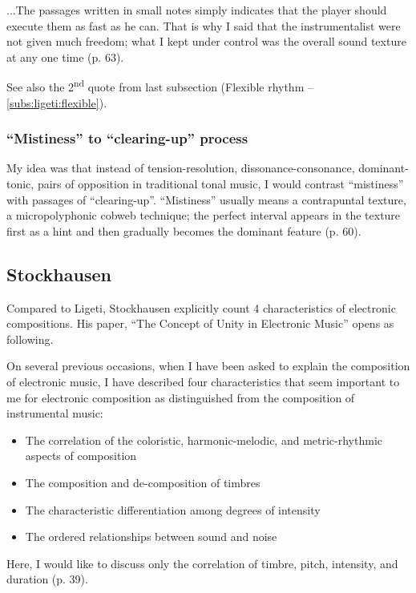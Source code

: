 \documentclass[a4paper,11pt]{article}
\newenvironment{MyShadequote}[1][]
    {\begin{mdframed}[style=MyShadeQuoteStyle,#1]}
    {\end{mdframed}}
\begin{document}
\begin{MyShadequote}
  ...The passages written in small notes simply indicates that the player should execute them as fast as he can.
  That is why I said that the instrumentalist were not given much freedom; what I kept under control was the overall sound texture at any one time (p. 63).
\end{MyShadequote}

See also the 2\textsuperscript{nd} quote from last subsection (Flexible rhythm -- \ref{subs:ligeti:flexible}).

\subsubsection{``Mistiness'' to ``clearing-up'' process}
\label{subs:ligeti:mistiness}

\begin{MyShadequote}
  My idea was that instead of tension-resolution, dissonance-consonance, dominant-tonic, pairs of opposition in traditional tonal music, I would contrast ``mistiness'' with passages of ``clearing-up''. ``Mistiness'' usually means a contrapuntal texture, a micropolyphonic cobweb technique; the perfect interval appears in the texture first as a hint and then gradually becomes the dominant feature (p. 60).
\end{MyShadequote}

\subsection{Stockhausen}
\label{sub:eshtetic_stockhausen}

Compared to Ligeti, Stockhausen explicitly count 4 characteristics of electronic compositions.
His paper, ``The Concept of Unity in Electronic Music'' opens as following.

\begin{MyShadequote}
  On several previous occasions, when I have been asked to explain the composition of electronic music, I have described four characteristics that seem important to me for electronic composition as distinguished from the composition of instrumental music:

  \begin{itemize}
    \item The correlation of the coloristic, harmonic-melodic, and metric-rhythmic aspects of composition
    \item The composition and de-composition of timbres
    \item The characteristic differentiation among degrees of intensity
    \item The ordered relationships between sound and noise
  \end{itemize}

  Here, I would like to discuss only the correlation of timbre, pitch, intensity, and duration (p. 39).
\end{MyShadequote}
\end{document}
